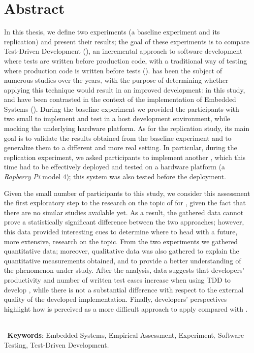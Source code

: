 \chapter*{Abstract}
In this thesis, we define two experiments (\ie a baseline experiment and its replication) and present their results; the goal of these experiments is to compare Test-Driven Development (\tdd), an incremental approach to software development where tests are written before production code, with a traditional way of testing where production code is written before tests (\ie \notdd). 
\tdd has been the subject of numerous studies over the years, with the purpose of determining whether applying this technique would result in an improved development: in this study, \tdd and \notdd have been contrasted in the context of the implementation of Embedded Systems (\ess).
During the baseline experiment we provided the participants with two small \ess to implement and test in a host development environment, while mocking the underlying hardware platform.
As for the replication study, its main goal is to validate the results obtained from the baseline experiment and to generalize them to a different and more real setting. 
In particular, during the replication experiment, we asked participants to implement another \es, which this time had to be effectively deployed and tested on a hardware platform (\ie a \textit{Rapberry Pi} model 4); this system was also tested before the deployment.

Given the small number of participants to this study, we consider this assessment the first exploratory step to the research on the topic of \tdd for \ess, given the fact that there are no similar studies available yet. As a result, the gathered data cannot prove a statistically significant difference between the two approaches; however, this data provided interesting cues to determine where to head with a future, more extensive, research on the topic.
From the two experiments we gathered quantitative data; moreover, qualitative data was also gathered to explain the quantitative measurements obtained, and to provide a better understanding of the phenomenon under study.
After the analysis, data suggests that developers' productivity and number of written test cases increase when using TDD to develop \ess, while there is not a substantial difference with respect to the external quality of the developed implementation. 
Finally, developers' perspectives highlight how \tdd is perceived as a more difficult approach to apply compared with \notdd.

\ \\ \
\noindent \textbf{Keywords}: Embedded Systems, Empirical Assessment, Experiment, Software Testing, Test-Driven Development.
